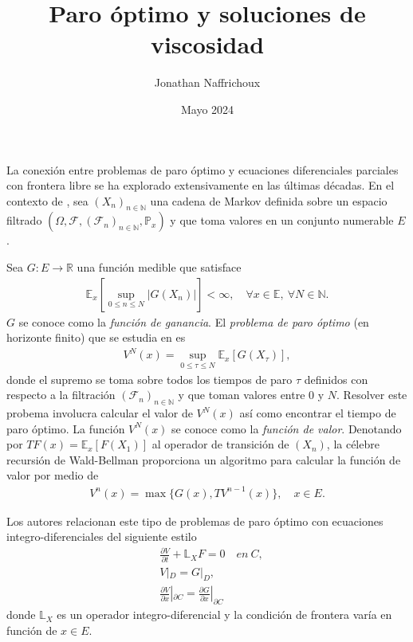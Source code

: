 \documentclass{article}
\title{Paro óptimo y soluciones de viscosidad}
\author{Jonathan Naffrichoux}
\date{Mayo 2024}
\numberwithin{equation}{section}
\begin{document}
\maketitle 
La conexión entre problemas de paro óptimo y ecuaciones diferenciales parciales con frontera libre se ha explorado extensivamente en las últimas décadas. En el contexto de \cite{peskir2006optimal}, sea $(X_n)_{n\in\mathbb{N}}$ una cadena de Markov definida sobre un espacio filtrado $(\Omega,\mathcal{F},(\mathcal{F}_n)_{n\in \mathbb{N}},\mathbb{P}_x)$ y que toma valores en un conjunto numerable $E$.

Sea $G : E \to \mathbb{R}$ una función medible que satisface 
\begin{align}\label{G-esperanza}
    \mathbb{E}_x\left[\sup_{0\leq n\leq N}|G(X_n)|\right] < \infty, \quad \forall x \in \mathbb{E},\: \forall N \in \mathbb{N}.
\end{align}
$G$ se conoce como la \emph{función de ganancia}. El \emph{problema de paro óptimo} (en horizonte finito) que se estudia en \cite{peskir2006optimal} es
\begin{align}\label{paro-optimo}
    V^N(x) = \sup_{0\leq \tau \leq N}\mathbb{E}_x\left[G(X_\tau)\right],
\end{align}
donde el supremo se toma sobre todos los tiempos de paro $\tau$ definidos con respecto a la filtración $(\mathcal{F}_n)_{n\in\mathbb{N}}$ y que toman valores entre $0$ y $N$. Resolver este probema involucra calcular el valor de $V^N(x)$ así como encontrar el tiempo de paro óptimo. La función $V^N(x)$ se conoce como la \emph{función de valor}. Denotando por $TF(x) = \mathbb{E}_x\left[F(X_1)\right]$ al operador de transición de $(X_n)$, la célebre recursión de Wald-Bellman proporciona un algoritmo para calcular la función de valor por medio de
\begin{align}\label{wb}
    V^n(x) = \max\{G(x), TV^{n-1}(x)\}, \quad x \in E.
\end{align}

Los autores relacionan este tipo de problemas de paro óptimo con ecuaciones integro-diferenciales del siguiente estilo
\begin{align*}
    &\frac{\partial V}{\partial t} + \mathbb{L}_XF = 0 \quad en \: C,\\
    &V|_D = G|_D,\\
    &\frac{\partial V}{\partial x}|_{\partial C} = \frac{\partial G}{\partial x}|_{\partial C}
\end{align*}
donde $\mathbb{L}_X$ es un operador integro-diferencial y la condición de frontera varía en función de $x \in E$.
\end{document}

